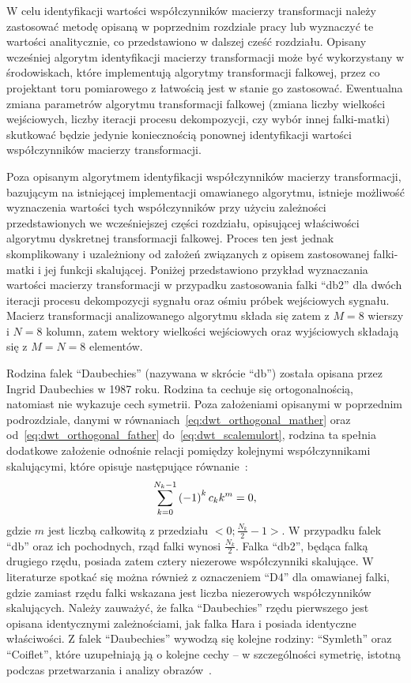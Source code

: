 W celu identyfikacji wartości współczynników macierzy transformacji należy zastosować metodę opisaną w poprzednim rozdziale pracy lub wyznaczyć te wartości analitycznie, co przedstawiono w dalszej cześć rozdziału. Opisany wcześniej algorytm identyfikacji macierzy transformacji może być wykorzystany w środowiskach, które implementują algorytmy transformacji falkowej, przez co projektant toru pomiarowego z łatwością jest w stanie go zastosować. Ewentualna zmiana parametrów algorytmu transformacji falkowej (zmiana liczby wielkości wejściowych, liczby iteracji procesu dekompozycji, czy wybór innej falki-matki) skutkować będzie jedynie koniecznością ponownej identyfikacji wartości współczynników macierzy transformacji.

Poza opisanym algorytmem identyfikacji współczynników macierzy transformacji, bazującym na istniejącej implementacji omawianego algorytmu, istnieje możliwość wyznaczenia wartości tych współczynników przy użyciu zależności przedstawionych we wcześniejszej części rozdziału, opisującej właściwości algorytmu dyskretnej transformacji falkowej. Proces ten jest jednak skomplikowany i uzależniony od założeń związanych z opisem zastosowanej falki-matki i jej funkcji skalującej. Poniżej przedstawiono przykład wyznaczania wartości macierzy transformacji w przypadku zastosowania falki \enquote{db2} dla dwóch iteracji procesu dekompozycji sygnału oraz ośmiu próbek wejściowych sygnału. Macierz transformacji analizowanego algorytmu składa się zatem z $M = 8$ wierszy i $N = 8$ kolumn, zatem wektory wielkości wejściowych oraz wyjściowych składają się z $M = N = 8$ elementów.

Rodzina falek \enquote{Daubechies} (nazywana w skrócie \enquote{db}) została opisana przez Ingrid Daubechies w 1987 roku. Rodzina ta cechuje się ortogonalnością, natomiast nie wykazuje cech symetrii. Poza założeniami opisanymi w poprzednim podrozdziale, danymi w równaniach~\eqref{eq:dwt_orthogonal_mather} oraz od~\eqref{eq:dwt_orthogonal_father} do~\eqref{eq:dwt_scalemulort}, rodzina ta spełnia dodatkowe założenie odnośnie relacji pomiędzy kolejnymi współczynnikami skalującymi, które opisuje następujące równanie~\cite{vonesch_dbbasics}:
\begin{equation}
\sum _{k=0} ^{N_k-1} \left(-1\right)^{k} c_{k} k^{m} = 0 \label{eq:db_musthave},
\end{equation}
gdzie $m$ jest liczbą całkowitą z przedziału $<0;\frac{N_{k}}{2}-1>$. W przypadku falek \enquote{db} oraz ich pochodnych, rząd falki wynosi $\frac{N_{k}}{2}$. Falka \enquote{db2}, będąca falką drugiego rzędu, posiada zatem cztery niezerowe współczynniki skalujące. W literaturze spotkać się można również z oznaczeniem \enquote{D4} dla omawianej falki, gdzie zamiast rzędu falki wskazana jest liczba niezerowych współczynników skalujących. Należy zauważyć, że falka \enquote{Daubechies} rzędu pierwszego jest opisana identycznymi zależnościami, jak falka Hara i posiada identyczne właściwości. Z falek \enquote{Daubechies} wywodzą się kolejne rodziny: \enquote{Symleth} oraz \enquote{Coiflet}, które uzupełniają ją o kolejne cechy -- w szczególności symetrię, istotną podczas przetwarzania i analizy obrazów~\cite{wallen_handbook, akujuobi_applications}.

